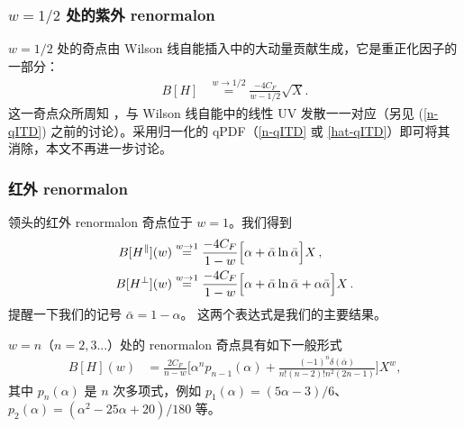 %
\subsubsection{$w= 1/2 $ 处的紫外 renormalon}\label{sect_uvren}%
%
$w=1/2$ 处的奇点由 Wilson 线自能插入中的大动量贡献生成，它是重正化因子的一部分：
\begin{align}
  B[H] &\stackrel{w\to 1/2}{=} \frac{-4C_F}{w-1/2}\sqrt{X}.
\end{align}
这一奇点众所周知 \cite{Beneke:1994sw}，与 Wilson 线自能中的线性 UV 发散一一对应（另见 (\ref{n-qITD}) 之前的讨论）。采用归一化的 qPDF（\eqref{n-qITD} 或 \eqref{hat-qITD}）即可将其消除，本文不再进一步讨论。

%
\subsubsection{红外 renormalon}\label{sect_irren}%
%
领头的红外 renormalon 奇点位于 $w=1$。我们得到
\begin{align}
\label{w=1}
B[H^\parallel](w) &\stackrel{w\to 1}{=} \frac{-4C_F}{1-w}\Big[\alpha + \bar\alpha \ln \bar\alpha\Big]X\,,
\notag\\
B[H^\perp](w) &\stackrel{w\to 1}{=} \frac{-4C_F}{1-w}\Big[\alpha + \bar\alpha \ln \bar\alpha + \alpha\bar\alpha\Big]X\,.
\end{align}
提醒一下我们的记号 $\bar\alpha = 1-\alpha$。
这两个表达式是我们的主要结果。

$w=n$（$n=2,3...$）处的 renormalon 奇点具有如下一般形式
\begin{align}
B[H](w)&=\frac{2C_F}{n-w}\Big[\alpha^np_{n-1}(\alpha)+\frac{(-1)^n\delta(\bar \alpha)}{n!(n\!-\!2)!n^2(2n\!-\!1)}\Big] X^w,
\end{align}
其中 $p_n(\alpha)$ 是 $n$ 次多项式，例如 $p_1(\alpha)=(5\alpha-3)/6$、$p_2(\alpha)=(\alpha^2-25\alpha+20)/180$ 等。


%
